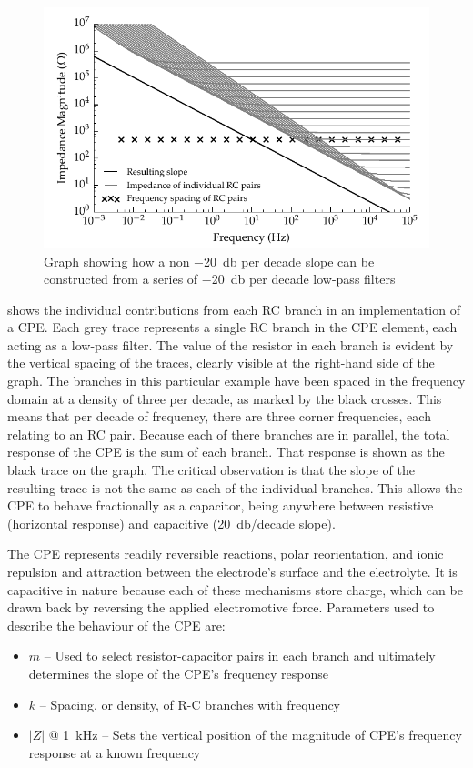     \begin{figure}
      \centering
      \includegraphics{content/pt2/07-InterfaceModel/graphics/graph_cpe_creation}
      \caption{\label{graph:pt2-cpe_creation}Graph showing how a non \SI{-20}{\decibel} per decade slope can be constructed from a series of \SI{-20}{\decibel} per decade low-pass filters}
    \end{figure}

     shows the individual contributions from each RC branch in an implementation of a CPE.
    Each grey trace represents a single RC branch in the CPE element, each acting as a low-pass filter.
    The value of the resistor in each branch is evident by the vertical spacing of the traces, clearly visible at the right-hand side of the graph.
    The branches in this particular example have been spaced in the frequency domain at a density of three per decade, as marked by the black crosses.
    This means that per decade of frequency, there are three corner frequencies, each relating to an RC pair.
    Because each of there branches are in parallel, the total response of the CPE is the sum of each branch.
    That response is shown as the black trace on the graph.
    The critical observation is that the slope of the resulting trace is not the same as each of the individual branches.
    This allows the CPE to behave fractionally as a capacitor, being anywhere between resistive (horizontal response) and capacitive (\SI{20}{\decibel}/decade slope).

    The CPE represents readily reversible reactions, polar reorientation, and ionic repulsion and attraction between the electrode's surface and the electrolyte.
    It is capacitive in nature because each of these mechanisms store charge, which can be drawn back by reversing the applied electromotive force.
    Parameters used to describe the behaviour of the CPE are:
    \begin{itemize}
      \item $m$ -- Used to select resistor-capacitor pairs in each branch and ultimately determines the slope of the CPE's frequency response
      \item $k$ -- Spacing, or density, of R-C branches with frequency
      \item $|Z|$ @ \SI{1}{\kilo\hertz} -- Sets the vertical position of the magnitude of CPE's frequency response at a known frequency
    \end{itemize}

